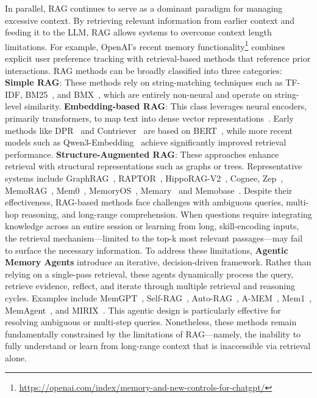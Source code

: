In parallel, RAG continues to serve as a dominant paradigm for managing excessive context. By retrieving relevant information from earlier context and feeding it to the LLM, RAG allows systems to overcome context length limitations. For example, OpenAI’s recent memory functionality\footnote{\url{https://openai.com/index/memory-and-new-controls-for-chatgpt/}} combines explicit user preference tracking with retrieval-based methods that reference prior interactions. RAG methods can be broadly classified into three categories:
\textbf{Simple RAG}: These methods rely on string-matching techniques such as TF-IDF, BM25~\citep{bm25}, and BMX~\citep{BMX}, which are entirely non-neural and operate on string-level similarity.
\textbf{Embedding-based RAG}: This class leverages neural encoders, primarily transformers, to map text into dense vector representations~\citep{wu2022pcl}. Early methods like DPR~\citep{karpukhin2020dense} and Contriever~\citep{contriever} are based on BERT~\citep{bert}, while more recent models such as Qwen3-Embedding~\citep{qwen3_embedding} achieve significantly improved retrieval performance.
\textbf{Structure-Augmented RAG}: These approaches enhance retrieval with structural representations such as graphs or trees. Representative systems include GraphRAG~\citep{graphrag}, RAPTOR~\citep{sarthi2024raptor}, HippoRAG-V2~\citep{hipporag-v2}, Cognee, Zep~\citep{Zep}, MemoRAG~\citep{memorag}, Mem0~\citep{Mem0}, MemoryOS~\citep{memoryos}, Memary~\citep{memary} and Memobase~\citep{memobase}. Despite their effectiveness, RAG-based methods face challenges with ambiguous queries, multi-hop reasoning, and long-range comprehension. When questions require integrating knowledge across an entire session or learning from long, skill-encoding inputs, the retrieval mechanism—limited to the top-k most relevant passages—may fail to surface the necessary information. 
To address these limitations, \textbf{Agentic Memory Agents} introduce an iterative, decision-driven framework. Rather than relying on a single-pass retrieval, these agents dynamically process the query, retrieve evidence, reflect, and iterate through multiple retrieval and reasoning cycles. Examples include MemGPT~\citep{MemGPT}, Self-RAG~\citep{self-rag}, Auto-RAG~\citep{auto-rag}, A-MEM~\citep{a-mem}, Mem1~\citep{mem1}, MemAgent~\citep{MemAgent}, and MIRIX~\citep{mirix}. This agentic design is particularly effective for resolving ambiguous or multi-step queries. Nonetheless, these methods remain fundamentally constrained by the limitations of RAG—namely, the inability to fully understand or learn from long-range context that is inaccessible via retrieval alone.
\vspace{-6pt}




